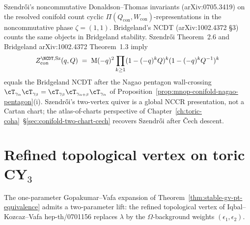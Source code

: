 \begin{remark}
\label{rem:szendroi-bridgeland-ncdt-agree}
Szendr\H{o}i's noncommutative Donaldson--Thomas invariants
(\textup{arXiv:0705.3419}) on the resolved conifold count cyclic
$\Pi(Q_{\mathrm{con}}, W_{\mathrm{con}})$-representations in the
noncommutative phase $\zeta = (1, 1)$. Bridgeland's NCDT
(\textup{arXiv:1002.4372} \S3) counts the same objects in Bridgeland
stability. Szendr\H{o}i Theorem~2.6 and Bridgeland
\textup{arXiv:1002.4372} Theorem~1.3 imply
\[
 Z^{\NCDT,\mathrm{Sz}}_{\mathrm{con}}(q, Q)
 \;=\;
 \mathrm{M}(-q)^{2} \prod_{k \geq 1}(1 - (-q)^{k} Q)^{k} (1 - (-q)^{k} Q^{-1})^{k}
\]
equals the Bridgeland NCDT after the Nagao pentagon wall-crossing
$\cT_{\gamma_\alpha} \cT_{\gamma_\beta} = \cT_{\gamma_\beta}
\cT_{\gamma_{\alpha + \beta}} \cT_{\gamma_\alpha}$ of
Proposition~\ref{prop:mnop-conifold-nagao-pentagon}(i). Szendr\H{o}i's
two-vertex quiver is a global NCCR presentation, not a Cartan chart;
the atlas-of-charts perspective of
Chapter~\ref{ch:toric-coha}~\S\ref{sec:conifold-two-chart-cech}
recovers Szendr\H{o}i after \v{C}ech descent.
\end{remark}

\section{Refined topological vertex on toric CY\texorpdfstring{$_3$}{-3}}
\label{sec:refined-topological-vertex}

The one-parameter Gopakumar--Vafa expansion of
Theorem~\ref{thm:stable-gv-pt-equivalence} admits a two-parameter
lift: the refined topological vertex of Iqbal--Kozcaz--Vafa
\textup{hep-th/0701156} replaces $\lambda$ by the $\Omega$-background
weights $(\epsilon_1, \epsilon_2)$.

